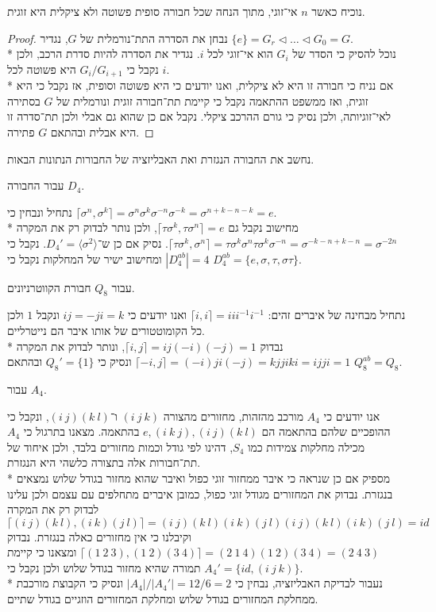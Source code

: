 \Subquestion{}
נוכיח כאשר $n$ אי־זוגי, מתוך הנחה שכל חבורה סופית פשוטה ולא ציקלית היא זוגית.
\begin{proof}
	נבחן את הסדרה התת־נורמלית של $G$, נגדיר $\{ e \} = G_r \triangleleft \dots \triangleleft G_0 = G$. \\*
	נוכל להסיק כי הסדר של $G_i$ הוא אי־זוגי לכל $i$.
	נגדיר את הסדרה להיות סדרת הרכב, ולכן נקבל כי $G_i / G_{i + 1}$ היא פשוטה לכל $i$. \\*
	אם נניח כי חבורה זו היא לא ציקלית, ואנו יודעים כי היא פשוטה וסופית, אז נקבל כי היא זוגית, ואז ממשפט ההתאמה נקבל כי קיימת תת־חבורה זוגית ונורמלית של $G$ בסתירה לאי־זוגיותה, ולכן נסיק כי גורם ההרכב ציקלי.
	נקבל אם כן שהוא גם אבלי ולכן תת־סדרה זו היא אבלית ובהתאם $G$ פתירה.
\end{proof}

\Question{}
נחשב את החבורה הנגזרת ואת האבליזציה של החבורות הנתונות הבאות.

\Subquestion{}
עבור החבורה $D_4$.

נתחיל ונבחין כי $\lceil \sigma^n, \sigma^k \rceil = \sigma^n \sigma^k \sigma^{-n} \sigma^{-k} = \sigma^{n + k - n - k} = e$. \\*
מחישוב נקבל גם $\lceil \tau \sigma^k, \tau \sigma^n \rceil = e$, ולכן נותר לבדוק רק את המקרה $\lceil \tau \sigma^k, \sigma^n \rceil = \tau \sigma^k \sigma^n \tau \sigma^k \sigma^{-n} = \sigma^{-k - n + k - n} = \sigma^{-2n}$.
נסיק אם כן ש־$D_4' = \langle \sigma^2 \rangle$.
נקבל כי $|D_4^{ab}| = 4$ ומחישוב ישיר של המחלקות נקבל כי $D_4^{ab} = \{ e, \sigma, \tau, \sigma \tau \}$.

\Subquestion{}
עבור $Q_8$ חבורת הקווטרניונים.

נתחיל מבחינה של איברים זהים: $\lceil i, i \rceil = i i i^{-1} i^{-1}$ ואנו יודעים כי $ij = -ji = k$ ונקבל $1$ ולכן כל הקומוטטורים של אותו איבר הם נייטרליים. \\*
נבדוק $\lceil i, j \rceil = i j (-i)(-j) = 1$, ונותר לבדוק את המקרה $\lceil -i, j \rceil = (-i)j i (-j) = kjjiki = ijji = 1$ ונסיק כי $Q_8' = \{ 1 \}$ ובהתאם $Q_8^{ab} = Q_8$.

\Subquestion{}
עבור $A_4$.

אנו יודעים כי $A_4$ מורכב מהזהות, מחזורים מהצורה $(i\ j\ k)$ ו־$(i\ j)(k\ l)$, ונקבל כי ההופכיים שלהם בהתאמה הם $e, (i\ k\ j), (i\ j)(k\ l)$ בהתאמה.
מצאנו בתרגול כי $A_4$ מכילה מחלקות צמידות כמו $S_4$, דהינו לפי גודל וכמות מחזורים בלבד, ולכן איחוד של תת־חבורות אלה בתצורה כלשהי היא הנגזרת. \\*
מספיק אם כן שנראה כי איבר ממחזור זוגי כפול ואיבר שהוא מחזור בגודל שלוש נמצאים בנגזרת.
נבדוק את המחזורים מגודל זוגי כפול, כמובן איברים מתחלפים עם עצמם ולכן עלינו לבדוק רק את המקרה $\lceil (i\ j)(k\ l), (i\ k)(j\ l) \rceil = (i\ j)(k\ l) (i\ k)(j\ l)(i\ j)(k\ l) (i\ k)(j\ l) = id$ וקיבלנו כי אין מחזורים כאלה בנגזרת.
נבדוק $\lceil (1\ 2\ 3), (1\ 2)(3\ 4) \rceil = (2\ 1\ 4)(1\ 2)(3\ 4) = (2\ 4\ 3)$ ומצאנו כי קיימת תמורה שהיא מחזור בגודל שלוש ולכן נקבל כי $A_4' = \{ id, (i\ j\ k) \}$. \\*
נעבור לבדיקת האבליזציה, נבחין כי $|A_4| / |A_4'| = 12 / 6 = 2$ ונסיק כי הקבוצת מורכבת ממחלקת המחזורים בגודל שלוש ומחלקת המחזורים הוזגיים בגודל שתיים.

